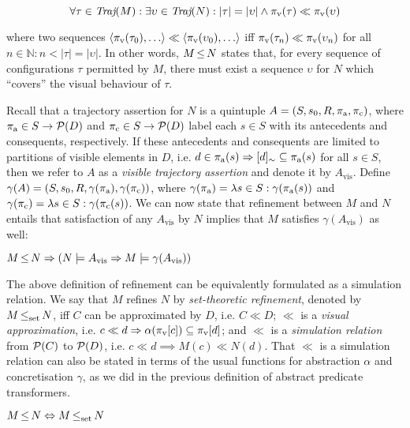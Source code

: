 \begin{equation*}
\forall \tau \in \operatorname{\textit{Traj}}(M) : \exists \upsilon \in \operatorname{\textit{Traj}}(N) : | \tau | = | \upsilon | \wedge \pi_{\textrm{v}}(\tau) \ll \pi_{\textrm{v}}(\upsilon)
\end{equation*}

\noindent where two sequences $\langle \pi_{\textrm{v}}(\tau_{0}), \ldots \rangle \ll \langle \pi_{\textrm{v}}(\upsilon_{0}), \ldots \rangle$ iff $\pi_{\textrm{v}}(\tau_{n}) \ll \pi_{\textrm{v}}(\upsilon_{n})$ for all $n \in \mathbb{N} : n < | \tau | = | \upsilon |$. In other words, $M \operatorname{\leq} N$ states that, for every sequence of configurations $\tau$ permitted by $M$, there must exist a sequence $\upsilon$ for $N$ which ``covers'' the visual behaviour of $\tau$.

Recall that a trajectory assertion for $N$ is a quintuple $A = (S, s_{0}, R, \operatorname{\pi_{\textrm{a}}}, \operatorname{\pi_{\textrm{c}}})$, where $\operatorname{\pi_{\textrm{a}}} \in S \rightarrow \mathcal{P}(D)$ and $\operatorname{\pi_{\textrm{c}}} \in S \rightarrow \mathcal{P}(D)$ label each $s \in S$ with its antecedents and consequents, respectively. If these antecedents and consequents are limited to partitions of visible elements in $D$, i.e. $d \in \operatorname{\pi_{\textrm{a}}}(s) \Rightarrow [d]_{\sim} \subseteq \operatorname{\pi_{\textrm{a}}}(s)$ for all $s \in S$, then we refer to $A$ as a \textit{visible trajectory assertion} and denote it by $A_{\textrm{vis}}$. Define $\gamma(A) = (S, s_{0}, R, \gamma(\operatorname{\pi_{\textrm{a}}}), \gamma(\operatorname{\pi_{\textrm{c}}}))$, where $\gamma(\operatorname{\pi_{\textrm{a}}}) = \lambda s \in S : \gamma(\operatorname{\pi_{\textrm{a}}}(s))$ and $\gamma(\operatorname{\pi_{\textrm{c}}}) = \lambda s \in S : \gamma(\operatorname{\pi_{\textrm{c}}}(s))$. We can now state that refinement between $M$ and $N$ entails that satisfaction of any $A_{\textrm{vis}}$ by $N$ implies that $M$ satisfies $\gamma(A_{\textrm{vis}})$ as well:

\begin{theorem} \label{thm:traj-refines}
$M \operatorname{\leq} N \Rightarrow (N \models A_{\textrm{vis}} \Rightarrow M \models \gamma(A_{\textrm{vis}}))$
\end{theorem}

The above definition of refinement can be equivalently formulated as a simulation relation. We say that $M$ refines $N$ by \textit{set-theoretic refinement}, denoted by $M \operatorname{\operatorname{\leq}_{\textrm{set}}} N$, iff $C$ can be approximated by $D$, i.e. $C \ll D$; $\ll$ is a \textit{visual approximation}, i.e. $c \ll d \Rightarrow \alpha(\pi_{\textrm{v}}[c]) \subseteq \pi_{\textrm{v}}[d]$; and $\ll$ is a \textit{simulation relation} from $\mathcal{P}(C)$ to $\mathcal{P}(D)$, i.e. $c \ll d \implies M(c) \ll N(d)$. That $\ll$ is a simulation relation can also be stated in terms of the usual functions for abstraction $\alpha$ and concretisation $\gamma$, as we did in the previous definition of abstract predicate transformers.

\begin{theorem} \label{thm:traj-equal-set}
$M \operatorname{\leq} N \Leftrightarrow M \operatorname{\operatorname{\leq}_{\textrm{set}}} N$
\end{theorem}
